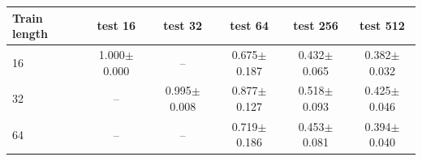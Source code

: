 \begin{tabular}{lccccc}
\toprule
Train length & test 16 & test 32 & test 64 & test 256 & test 512 \\
\midrule
16 & 1.000$\pm$0.000 & -- & 0.675$\pm$0.187 & 0.432$\pm$0.065 & 0.382$\pm$0.032 \\
32 & -- & 0.995$\pm$0.008 & 0.877$\pm$0.127 & 0.518$\pm$0.093 & 0.425$\pm$0.046 \\
64 & -- & -- & 0.719$\pm$0.186 & 0.453$\pm$0.081 & 0.394$\pm$0.040 \\
\bottomrule
\end{tabular}
